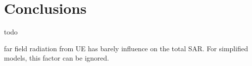 \chapter{Conclusions}
\label{chap:conclusions}

todo

far field radiation from UE has barely influence on the total SAR. For simplified models, this factor can be ignored.